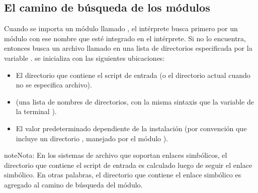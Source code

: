 \documentclass[a4,10pt,spanish]{sphinxmanual}
\begin{document}
\subsection{El camino de búsqueda de los módulos}
\label{\detokenize{tutorial/modules:the-module-search-path}}\label{\detokenize{tutorial/modules:tut-searchpath}}
\ignorespaces 
\sphinxAtStartPar
Cuando se importa un módulo llamado , el intérprete busca primero por un módulo con ese nombre que esté integrado en el intérprete. Si no lo encuentra, entonces busca un archivo llamado   en una lista de directorios especificada por la variable .  se inicializa con las siguientes ubicaciones:
\begin{itemize}
\item {} 
\sphinxAtStartPar
El directorio que contiene el script de entrada (o el directorio actual cuando no se especifica archivo).

\item {} 
\sphinxAtStartPar
{} (una lista de nombres de directorios, con la misma sintaxis que la variable de la terminal ).

\item {} 
\sphinxAtStartPar
El valor predeterminado dependiente de la instalación (por convención que incluye un directorio , manejado por el módulo ).

\end{itemize}

\begin{sphinxadmonition}{note}{Nota:}
\sphinxAtStartPar
En los sistemas de archivo que soportan enlaces simbólicos, el directorio que contiene el script de entrada es calculado luego de seguir el enlace simbólico. En otras palabras, el directorio que contiene el enlace simbólico  es agregado al camino de búsqueda del módulo.
\end{sphinxadmonition}
\end{document}
